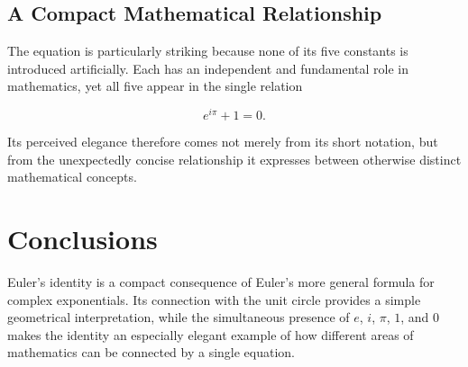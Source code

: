 \documentclass[a4paper,11pt]{article}
\begin{document}
\subsection{A Compact Mathematical Relationship}

The equation is particularly striking because none of its five
constants is introduced artificially. Each has an independent and
fundamental role in mathematics, yet all five appear in the single
relation

\[
    e^{i\pi}+1=0.
\]

Its perceived elegance therefore comes not merely from its short
notation, but from the unexpectedly concise relationship it expresses
between otherwise distinct mathematical concepts.



\section{Conclusions}

Euler's identity is a compact consequence of Euler's more general
formula for complex exponentials. Its connection with the unit circle
provides a simple geometrical interpretation, while the simultaneous
presence of $e$, $i$, $\pi$, $1$, and $0$ makes the identity an
especially elegant example of how different areas of mathematics can
be connected by a single equation.
%
%
%
%


\clearpage


%
%

\pagestyle{empty}

\printbibliography[
    heading=bibintoc,
    title={References}
]
\end{document}
